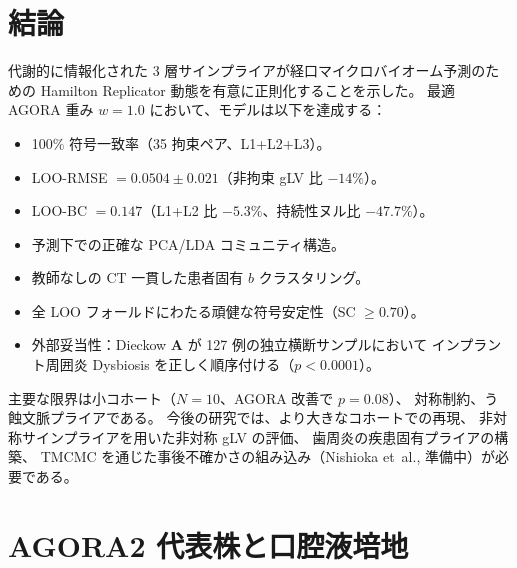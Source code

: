 \documentclass[11pt,a4paper]{article}
\newcommand{\bA}{\mathbf{A}}
\begin{document}
\section{結論}
\label{sec:conclusions}

代謝的に情報化された 3 層サインプライアが経口マイクロバイオーム予測のための
Hamilton Replicator 動態を有意に正則化することを示した。
最適 AGORA 重み $w=1.0$ において、モデルは以下を達成する：
\begin{itemize}[noitemsep]
  \item 100\% 符号一致率（35 拘束ペア、L1+L2+L3）。
  \item LOO-RMSE $= 0.0504\pm0.021$（非拘束 gLV 比 $-14\%$）。
  \item LOO-BC $= 0.147$（L1+L2 比 $-5.3\%$、持続性ヌル比 $-47.7\%$）。
  \item 予測下での正確な PCA/LDA コミュニティ構造。
  \item 教師なしの CT 一貫した患者固有 $\hat{b}$ クラスタリング。
  \item 全 LOO フォールドにわたる頑健な符号安定性（SC $\geq 0.70$）。
  \item 外部妥当性：Dieckow $\bA$ が 127 例の独立横断サンプルにおいて
        インプラント周囲炎 Dysbiosis を正しく順序付ける（$p<0.0001$）。
\end{itemize}
主要な限界は小コホート（$N=10$、AGORA 改善で $p=0.08$）、
対称制約、う蝕文脈プライアである。
今後の研究では、より大きなコホートでの再現、
非対称サインプライアを用いた非対称 gLV の評価、
歯周炎の疾患固有プライアの構築、
TMCMC を通じた事後不確かさの組み込み（Nishioka et~al., 準備中）が必要である。

\appendix

\section{AGORA2 代表株と口腔液培地}
\label{app:agora}
\end{document}
